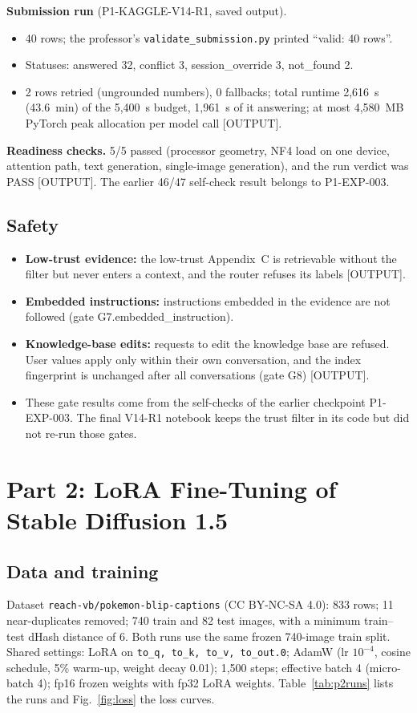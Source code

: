 \documentclass[conference]{IEEEtran}
\begin{document}
\textbf{Submission run} (P1-KAGGLE-V14-R1, saved output).
\begin{itemize}
\item 40 rows; the professor's \texttt{validate\_submission.py} printed ``valid: 40 rows''.
\item Statuses: answered 32, conflict 3, session\_override 3, not\_found 2.
\item 2 rows retried (ungrounded numbers), 0 fallbacks; total runtime 2{,}616~s (43.6~min) of the 5{,}400~s budget, 1{,}961~s of it answering; at most 4{,}580~MB PyTorch peak allocation per model call [OUTPUT].
\end{itemize}

\textbf{Readiness checks.} 5/5 passed (processor geometry, NF4 load on one device, attention path, text generation, single-image generation), and the run verdict was PASS [OUTPUT]. The earlier 46/47 self-check result belongs to P1-EXP-003.

\subsection{Safety}
\begin{itemize}
\item \textbf{Low-trust evidence:} the low-trust Appendix~C is retrievable without the filter but never enters a context, and the router refuses its labels [OUTPUT].
\item \textbf{Embedded instructions:} instructions embedded in the evidence are not followed (gate G7.embedded\_instruction).
\item \textbf{Knowledge-base edits:} requests to edit the knowledge base are refused. User values apply only within their own conversation, and the index fingerprint is unchanged after all conversations (gate G8) [OUTPUT].
\item These gate results come from the self-checks of the earlier checkpoint P1-EXP-003. The final V14-R1 notebook keeps the trust filter in its code but did not re-run those gates.
\end{itemize}

\section{Part 2: LoRA Fine-Tuning of Stable Diffusion 1.5}
\subsection{Data and training}
Dataset \texttt{reach-vb/pokemon-blip-captions} (CC BY-NC-SA 4.0): 833 rows; 11 near-duplicates removed; 740 train and 82 test images, with a minimum train--test dHash distance of 6. Both runs use the same frozen 740-image train split. Shared settings: LoRA on \texttt{to\_q, to\_k, to\_v, to\_out.0}; AdamW (lr $10^{-4}$, cosine schedule, 5\% warm-up, weight decay 0.01); 1{,}500 steps; effective batch 4 (micro-batch 4); fp16 frozen weights with fp32 LoRA weights. Table~\ref{tab:p2runs} lists the runs and Fig.~\ref{fig:loss} the loss curves.
\end{document}
